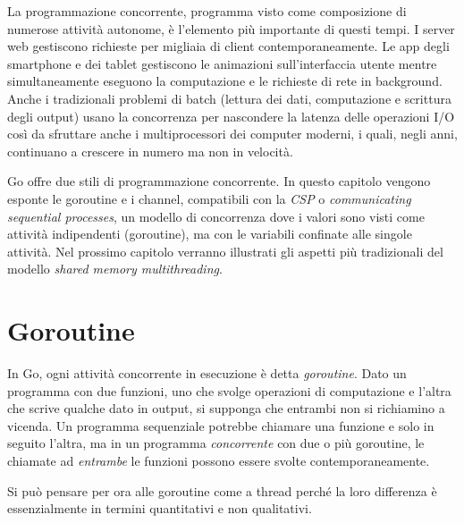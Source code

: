 La programmazione concorrente, programma visto come composizione di numerose attività autonome, è l'elemento più importante di questi tempi.
I server web gestiscono richieste per migliaia di client contemporaneamente.
Le app degli smartphone e dei tablet gestiscono le animazioni sull'interfaccia utente mentre simultaneamente eseguono la computazione e le richieste di rete in background.
Anche i tradizionali problemi di batch (lettura dei dati, computazione e scrittura degli output) usano la concorrenza per nascondere la latenza delle operazioni I/O così da sfruttare anche i multiprocessori dei computer moderni, i quali, negli anni, continuano a crescere in numero ma non in velocità.

Go offre due stili di programmazione concorrente.
In questo capitolo vengono esponte le goroutine e i channel, compatibili con la \textit{CSP} o \textit{communicating sequential processes}, un modello di concorrenza dove i valori sono visti come attività indipendenti (goroutine), ma con le variabili confinate alle singole attività.
Nel prossimo capitolo verranno illustrati gli aspetti più tradizionali del modello \textit{shared memory multithreading}.


\section{Goroutine}
\label{sec:goroutine}%
In Go, ogni attività concorrente in esecuzione è detta \textit{goroutine}.
Dato un programma con due funzioni, uno che svolge operazioni di computazione e l'altra che scrive qualche dato in output, si supponga che entrambi non si richiamino a vicenda.
Un programma sequenziale potrebbe chiamare una funzione e solo in seguito l'altra, ma in un programma \textit{concorrente} con due o più goroutine, le chiamate ad \textit{entrambe} le funzioni possono essere svolte contemporaneamente.

Si può pensare per ora alle goroutine come a thread perché la loro differenza è essenzialmente in termini quantitativi e non qualitativi.

